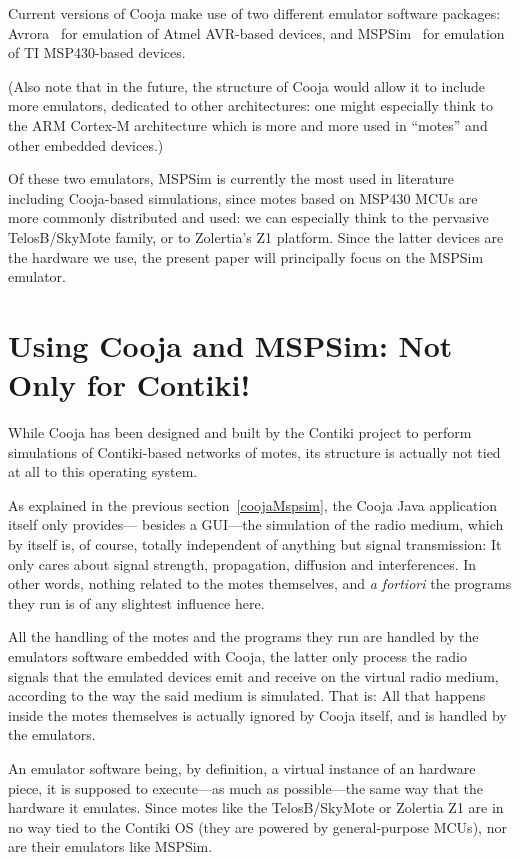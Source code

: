 \documentclass[10pt]{ewsn-proc}
\begin{document}
Current versions of Cooja make use of two different emulator software
packages: Avrora~\cite{Avrora} for emulation of Atmel AVR-based devices,
and MSPSim~\cite{MSPSim} for emulation of TI MSP430-based devices.

(Also note that in the future, the structure of Cooja would allow it
to include more emulators, dedicated to other architectures: one might
especially think to the ARM Cortex-M architecture which is more and
more used in ``motes'' and other embedded devices.)

Of these two emulators, MSPSim is currently the most used in literature
including Cooja-based simulations, since motes based on MSP430 MCUs are
more commonly distributed and used: we can especially think to the pervasive
TelosB/SkyMote family, or to Zolertia's Z1 platform. Since the latter
devices are the hardware we use, the present paper will principally
focus on the MSPSim emulator.



\section{Using Cooja and MSPSim: Not Only for Contiki!}
\label{newUses}

While Cooja has been designed and built by the Contiki project to perform
simulations of Contiki-based networks of motes, its structure is actually
not tied at all to this operating system.

As explained in the previous section~\ref{coojaMspsim}, the Cooja Java
application itself only provides--- besides a GUI---the simulation of the
radio medium, which by itself is, of course, totally independent of
anything but signal transmission: It only cares about signal strength,
propagation, diffusion and interferences. In other words, nothing related
to the motes themselves, and \textit{a fortiori} the programs they run
is of any slightest influence here.

All the handling of the motes and the programs they run are handled by
the emulators software embedded with Cooja, the latter only process the
radio signals that the emulated devices emit and receive on the virtual
radio medium, according to the way the said medium is simulated.
That is: All that happens inside the motes themselves is actually
ignored by Cooja itself, and is handled by the emulators.

An emulator software being, by definition, a virtual instance of an
hardware piece, it is supposed to execute---as much as possible---the
same way that the hardware it emulates. Since motes like the TelosB/SkyMote
or Zolertia Z1 are in no way tied to the Contiki OS (they are powered
by general-purpose MCUs), nor are their emulators like MSPSim.
\end{document}
